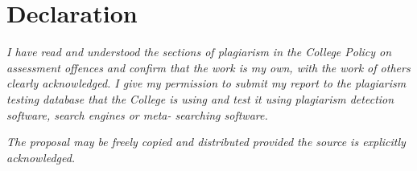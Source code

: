 \documentclass[12pt, twoside, a4paper]{report}
\begin{document}

\chapter*{Declaration}

\vfill
\textit{I have read and understood the sections of plagiarism in the College Policy on assessment offences and confirm that the work is my own, with the work of others clearly acknowledged. I give my permission to submit my report to the plagiarism testing database that the College is using and test it using plagiarism detection software, search engines or meta- searching software.}

\textit{The proposal may be freely copied and distributed provided the source is explicitly acknowledged.}
\vfill

\cleardoublepage



\tableofcontents
\thispagestyle{empty}
\cleardoublepage
    
\setcounter{page}{1}





\printbibliography[heading=bibintoc,
title={References}]
\end{document}
